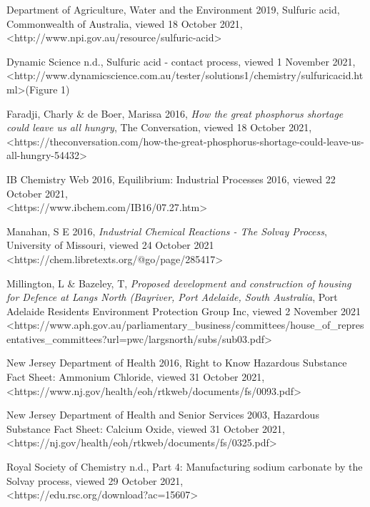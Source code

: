 \documentclass[12pt, a4paper]{article}
\begin{document}
Department of Agriculture, Water and the Environment 2019, Sulfuric acid, Commonwealth of Australia, viewed 18 October 2021, \textless{http://www.npi.gov.au/resource/sulfuric-acid}\textgreater

Dynamic Science n.d., Sulfuric acid - contact process, viewed 1 November 2021, \textless{http://www.dynamicscience.com.au/tester/solutions1/chemistry/sulfuricacid.html}\textgreater (Figure 1)

Faradji, Charly \& de Boer, Marissa 2016, \emph{How the great phosphorus shortage could leave us all hungry}, The Conversation, viewed 18 October 2021, \\ \textless{https://theconversation.com/how-the-great-phosphorus-shortage-could-leave-us-all-hungry-54432}\textgreater

IB Chemistry Web 2016, Equilibrium: Industrial Processes 2016, viewed 22 October 2021, \\ \textless{https://www.ibchem.com/IB16/07.27.htm}\textgreater

Manahan, S E 2016, \emph{Industrial Chemical Reactions - The Solvay Process}, University of Missouri, viewed 24 October 2021 \\ \textless{https://chem.libretexts.org/@go/page/285417}\textgreater

Millington, L \& Bazeley, T, \emph{Proposed development and construction of housing for Defence at Langs North (Bayriver, Port Adelaide, South Australia}, Port Adelaide Residents Environment Protection Group Inc, viewed 2 November 2021 \\ \textless{https://www.aph.gov.au/parliamentary_business/committees/house_of_representatives_committees?url=pwc/largsnorth/subs/sub03.pdf}\textgreater

New Jersey Department of Health 2016, Right to Know Hazardous Substance Fact Sheet: Ammonium Chloride, viewed 31 October 2021, \\ \textless{https://www.nj.gov/health/eoh/rtkweb/documents/fs/0093.pdf}\textgreater

New Jersey Department of Health and Senior Services 2003, Hazardous Substance Fact Sheet: Calcium Oxide, viewed 31 October 2021, \\ \textless{https://nj.gov/health/eoh/rtkweb/documents/fs/0325.pdf}\textgreater

Royal Society of Chemistry n.d., Part 4: Manufacturing sodium carbonate by the Solvay process, viewed 29 October 2021, \\ \textless{https://edu.rsc.org/download?ac=15607}\textgreater
\end{document}
